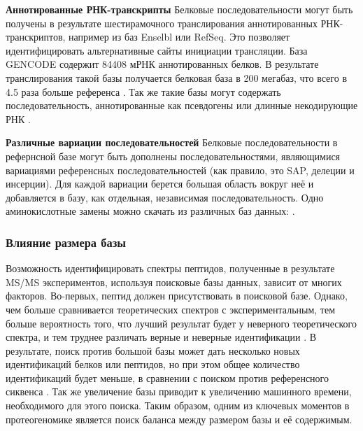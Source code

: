 

\textbf{Аннотированные РНК-транскрипты} Белковые последовательности могут быть получены в результате шестирамочного транслирования аннотированных РНК-транскриптов, например из баз Enselbl или RefSeq. Это позволяет идентифицировать альтернативные сайты инициации трансляции. База GENCODE содержит 84408 мРНК аннотированных белков. В результате транслирования такой базы получается белковая база в 200 мегабаз, что всего в 4.5 раза больше референса \cite{khatun2013whole}. Так же такие базы могут содержать последовательность, аннотированные как псевдогены или длинные некодирующие РНК \cite{derrien2012gencode}.


\textbf{Различные вариации последовательностей} Белковые последовательности в рефернсной базе могут быть дополнены последовательностями, являющимися вариациями референсных последовательностей (как правило, это SAP, делеции и инсерции). Для каждой вариации берется большая область вокруг неё и добавляется в базу, как отдельная, независимая последовательность. Одно аминокислотные замены можно скачать из различных баз данных:  \cite{li2011bioinformatics}.  


\subsubsection{Влияние размера базы}
Возможность идентифицировать спектры пептидов, полученные в результате MS/MS экспериментов, используя поисковые базы данных, зависит от многих факторов. Во-первых, пептид должен присутствовать в поисковой базе. Однако, чем больше сравнивается теоретических спектров с экспериментальным, тем больше вероятность того, что лучший результат будет у неверного теоретического спектра, и тем труднее различать верные и неверные идентификации \cite{nesvizhskii2010survey}. В результате, поиск против большой базы может дать несколько новых идентификаций белков или пептидов, но при этом общее количество идентификаций будет меньше, в сравнении с поиском против референсного сиквенса \cite{blakeley2012addressing, krug2013deep}. Так же увеличение базы приводит к увеличению машинного времени, необходимого для этого поиска. Таким образом, одним из ключевых моментов в протеогеномике является поиск баланса между размером базы и её содержимым.

